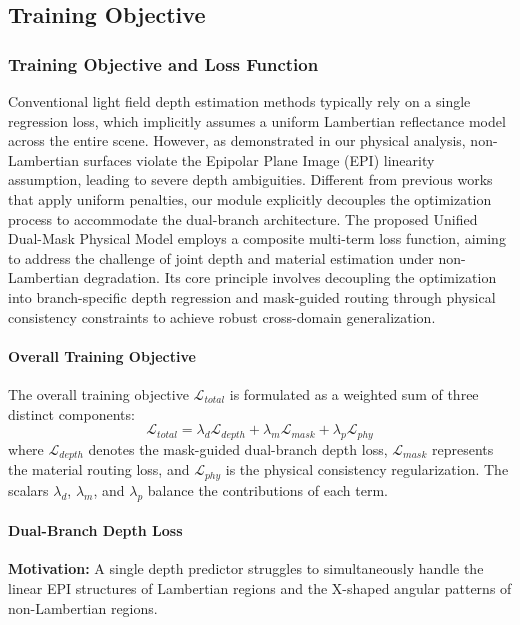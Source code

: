 \documentclass[lettersize,journal]{IEEEtran}
\begin{document}
\subsection{Training Objective}

\subsubsection{Training Objective and Loss Function}

Conventional light field depth estimation methods typically rely on a single regression loss, which implicitly assumes a uniform Lambertian reflectance model across the entire scene. However, as demonstrated in our physical analysis, non-Lambertian surfaces violate the Epipolar Plane Image (EPI) linearity assumption, leading to severe depth ambiguities. Different from previous works that apply uniform penalties, our module explicitly decouples the optimization process to accommodate the dual-branch architecture. The proposed Unified Dual-Mask Physical Model employs a composite multi-term loss function, aiming to address the challenge of joint depth and material estimation under non-Lambertian degradation. Its core principle involves decoupling the optimization into branch-specific depth regression and mask-guided routing through physical consistency constraints to achieve robust cross-domain generalization.

\paragraph{Overall Training Objective}
The overall training objective $\mathcal{L}_{total}$ is formulated as a weighted sum of three distinct components:
\begin{equation}
\mathcal{L}_{total} = \lambda_{d} \mathcal{L}_{depth} + \lambda_{m} \mathcal{L}_{mask} + \lambda_{p} \mathcal{L}_{phy}
\label{eq:ch3_23}
\end{equation}
where $\mathcal{L}_{depth}$ denotes the mask-guided dual-branch depth loss, $\mathcal{L}_{mask}$ represents the material routing loss, and $\mathcal{L}_{phy}$ is the physical consistency regularization. The scalars $\lambda_{d}$, $\lambda_{m}$, and $\lambda_{p}$ balance the contributions of each term.

\paragraph{Dual-Branch Depth Loss}
\textbf{Motivation:} A single depth predictor struggles to simultaneously handle the linear EPI structures of Lambertian regions and the X-shaped angular patterns of non-Lambertian regions. 
\end{document}
